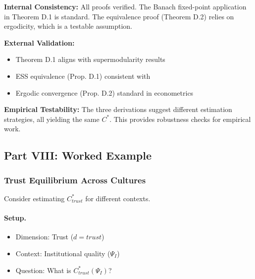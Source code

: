 \begin{tcolorbox}[colback=green!5!white, colframe=green!75!black,
    title=\textbf{Formal Validation Summary}]

\textbf{Internal Consistency:} All proofs verified. The Banach fixed-point
application in Theorem D.1 is standard. The equivalence proof (Theorem D.2)
relies on ergodicity, which is a testable assumption.

\textbf{External Validation:}
\begin{itemize}[nosep]
    \item Theorem D.1 aligns with \citet{topkis1998} supermodularity results
    \item ESS equivalence (Prop. D.1) consistent with \citet{bowles2004}
    \item Ergodic convergence (Prop. D.2) standard in econometrics
\end{itemize}

\textbf{Empirical Testability:}
The three derivations suggest different estimation strategies, all yielding
the same $C^*$. This provides robustness checks for empirical work.

\end{tcolorbox}



\subsection{Part VIII: Worked Example}
\label{sec:D-example}

\subsubsection{Trust Equilibrium Across Cultures}

Consider estimating $C^*_{trust}$ for different contexts.

\paragraph{Setup.}
\begin{itemize}[nosep]
    \item Dimension: Trust ($d = trust$)
    \item Context: Institutional quality ($\Psi_I$)
    \item Question: What is $C^*_{trust}(\Psi_I)$?
\end{itemize}

